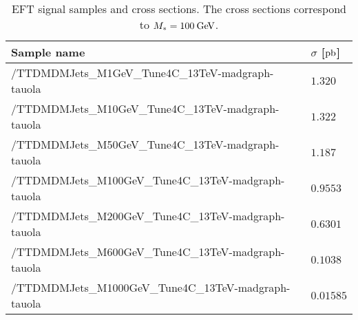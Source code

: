 \begin{table}[!ht]
\centering
\begin{tabular}{|l|l|}
\hline
  Sample name                                          & $\sigma$ [$\mathrm{pb}$] \\
\hline
  /TTDMDMJets\_M1GeV\_Tune4C\_13TeV-madgraph-tauola    & $1.320$ \\
  /TTDMDMJets\_M10GeV\_Tune4C\_13TeV-madgraph-tauola   & $1.322$ \\
  /TTDMDMJets\_M50GeV\_Tune4C\_13TeV-madgraph-tauola   & $1.187$ \\
  /TTDMDMJets\_M100GeV\_Tune4C\_13TeV-madgraph-tauola  & $0.9553$ \\
  /TTDMDMJets\_M200GeV\_Tune4C\_13TeV-madgraph-tauola  & $0.6301$ \\
  /TTDMDMJets\_M600GeV\_Tune4C\_13TeV-madgraph-tauola  & $0.1038$ \\
  /TTDMDMJets\_M1000GeV\_Tune4C\_13TeV-madgraph-tauola & $0.01585$ \\
\hline
\end{tabular}
\caption{EFT signal samples and cross sections. The cross sections correspond to $M_{*}=100\:\mathrm{Ge\kern -0.1em V}$.}
\label{tab:ttdm_samples}
\end{table}


